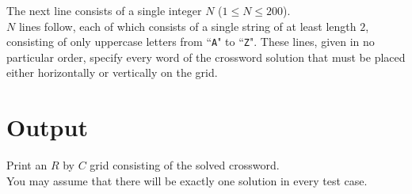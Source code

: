\noindent The next line consists of a single integer $N$ ($1 \leq N \leq 200$).\\

\noindent $N$ lines follow, each of which consists of a single string of at least length $2$, consisting of only uppercase letters from ``\texttt{A}" to ``\texttt{Z}". These lines, given in no particular order, specify every word of the crossword solution that must be placed either horizontally or vertically on the grid.

\section*{Output}
Print an $R$ by $C$ grid consisting of the solved crossword.\\
You may assume that there will be exactly one solution in every test case.\\
